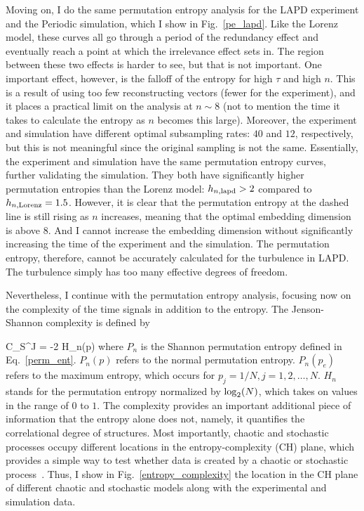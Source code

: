Moving on, I do the same permutation entropy analysis for the LAPD experiment and the Periodic simulation, which I show in Fig.~\ref{pe_lapd}. Like the Lorenz model, these curves all go
through a period of the redundancy effect and eventually reach a point at which the irrelevance effect sets in. The region between these two effects is harder to see, but that is not important.
One important effect, however, is the falloff of the entropy for high $\tau$ and high $n$. This is a result of using too few reconstructing vectors (fewer for the experiment), 
and it places a practical limit on the analysis at $n \sim 8$ (not to mention the time it takes to calculate the entropy as $n$ becomes this large).
Moreover, the experiment and simulation have different optimal subsampling rates: $40$ and $12$, respectively, but this is not meaningful since the original sampling is not the same. Essentially, the
experiment and simulation have the same permutation entropy curves, further validating the simulation. 
They both have significantly higher permutation entropies than the Lorenz model: $h_{n,{\rm{lapd}}} > 2$ compared to $h_{n,{\rm{Lorenz}}} = 1.5$. However, it is clear that the
permutation entropy at the dashed line is still rising as $n$ increases, meaning that the optimal embedding dimension is above $8$. And I cannot increase the embedding dimension without significantly
increasing the time of the experiment and the simulation. The permutation entropy, therefore, cannot be accurately calculated for the turbulence in LAPD. The turbulence simply has too many effective
degrees of freedom.

Nevertheless, I continue with the permutation entropy analysis, focusing now on the complexity of the time signals in addition to the entropy. The Jenson-Shannon complexity is 
defined by~\cite{rosso2007}

\beq
\label{csj}
C_S^J = -2  H_n(p)
\eeq
where $P_n$ is the Shannon permutation entropy defined in Eq.~\ref{perm_ent}. $P_n(p)$ refers to the normal permutation entropy. $P_n(p_e)$ refers to the maximum entropy, which occurs for
$p_j = 1/N, j=1,2,\ldots,N$. $H_n$ stands for the permutation entropy normalized by ${\rm{log}}_2(N)$, which takes on values in the range of $0$ to $1$. The complexity provides an important
additional piece of information that the entropy alone does not, namely, it quantifies the correlational degree of structures. Most importantly, chaotic and stochastic processes occupy
different locations in the entropy-complexity (CH) plane, which provides a simple way to test whether data is created by a chaotic or stochastic process~\cite{rosso2007}. Thus, I show in
Fig.~\ref{entropy_complexity} the location in the CH plane of different chaotic and stochastic models along with the experimental and simulation data.


